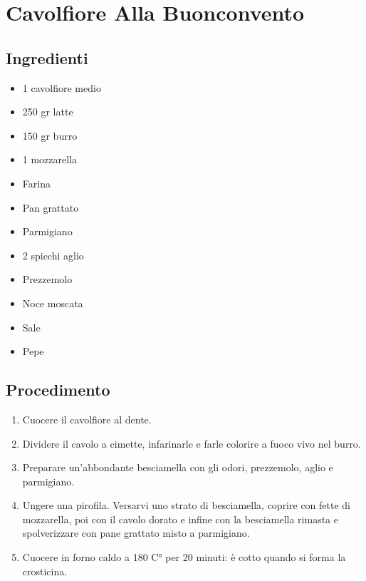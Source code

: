 \section{Cavolfiore Alla Buonconvento}
\subsection{Ingredienti}
\begin{itemize}
\item 1 cavolfiore medio  
\item 250 gr latte  
\item 150 gr burro  
\item 1 mozzarella   
\item Farina  
\item Pan grattato  
\item Parmigiano  
\item 2 spicchi aglio  
\item Prezzemolo  
\item Noce moscata  
\item Sale  
\item Pepe
\end{itemize}
\subsection{Procedimento}
\begin{enumerate}
\item  Cuocere il cavolfiore al dente.  
\item  Dividere il cavolo a cimette, infarinarle e farle colorire a fuoco vivo nel burro.   
\item  Preparare un'abbondante besciamella con gli odori, prezzemolo, aglio e parmigiano.   
\item  Ungere una pirofila. Versarvi uno strato di besciamella, coprire con fette di mozzarella, poi con il cavolo dorato e infine con la besciamella rimasta e spolverizzare con pane grattato misto a parmigiano.  
\item  Cuocere in forno caldo a 180 C° per 20 minuti: è cotto quando si forma la crosticina.
\end{enumerate}
